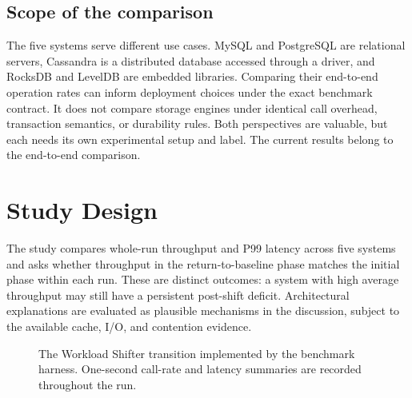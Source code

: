 \documentclass[10pt]{article}
\begin{document}
\subsection{Scope of the comparison}
The five systems serve different use cases. MySQL and PostgreSQL are relational servers, Cassandra is a distributed database accessed through a driver, and RocksDB and LevelDB are embedded libraries. Comparing their end-to-end operation rates can inform deployment choices under the exact benchmark contract. It does not compare storage engines under identical call overhead, transaction semantics, or durability rules. Both perspectives are valuable, but each needs its own experimental setup and label. The current results belong to the end-to-end comparison.

\section{Study Design}
\label{sec:design}
The study compares whole-run throughput and P99 latency across five systems and asks whether throughput in the return-to-baseline phase matches the initial phase within each run. These are distinct outcomes: a system with high average throughput may still have a persistent post-shift deficit. Architectural explanations are evaluated as plausible mechanisms in the discussion, subject to the available cache, I/O, and contention evidence.

\begin{figure}[htbp]
\centering
{}
\caption{The Workload Shifter transition implemented by the benchmark harness. One-second call-rate and latency summaries are recorded throughout the run.}
\label{fig:design}
\end{figure}
\end{document}
